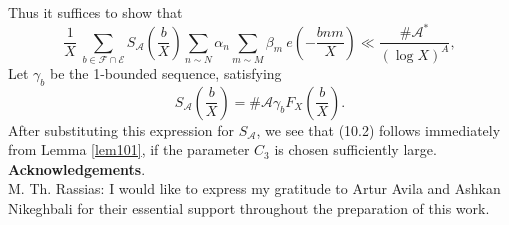 \documentclass{amsart}
\numberwithin{equation}{subsection}
\begin{document}
Thus it suffices to show that 
\[ 
\frac{1}{X}\:\sum_{b\in\mathcal{F}\cap \mathcal{E}}S_{\mathcal{A}}\left(\frac{b}{X}\right) \sum_{n\sim N} \alpha_n \sum_{m\sim M} \beta_m\: e\left(-\frac{bnm}{X}\right)\ll \frac{\#\mathcal{A}^*}{(\log X)^{A}},   \tag{10.2}
\]
Let $\gamma_b$ be the 1-bounded sequence, satisfying 
$$S_{\mathcal{A}}\left(\frac{b}{X}\right)=\#\mathcal{A}\gamma_b F_X\left(\frac{b}{X}\right).$$
After substituting this expression for $S_{\mathcal{A}}$, we see that (10.2) follows immediately from Lemma \ref{lem101}, if the parameter $C_3$  is chosen sufficiently large.\\ 



%
%
\noindent\textbf{Acknowledgements}.\\
M. Th. Rassias: I would like to express my gratitude to Artur Avila and Ashkan Nikeghbali for their essential support throughout the preparation of this work.
\end{document}
